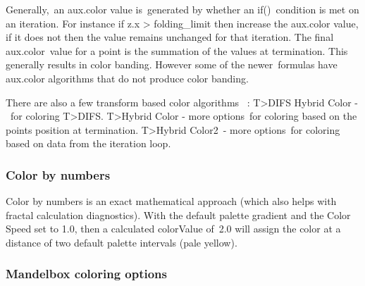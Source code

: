 Generally, an aux.color value is generated by whether an if() condition is met on an iteration. For instance if z.x > folding_limit then increase the aux.color value, if it does not then the value remains unchanged for that iteration. The final aux.color value for a point is the summation of the values at termination. This generally results in color banding. However some of the newer formulas have aux.color algorithms that do not produce color banding.

There are also a few transform based color algorithms  :
T>DIFS Hybrid Color - for coloring T>DIFS.
T>Hybrid Color - more options for coloring based on the points position at termination.
T>Hybrid Color2 - more options for coloring based on data from the iteration loop.


\subsubsection{Color by numbers}\label{materials-color by numbers}

Color by numbers is an exact mathematical approach (which also helps with fractal calculation diagnostics).
With the default palette gradient and the Color Speed set to 1.0, then a calculated colorValue of 2.0 will assign the color at a distance of two default palette intervals (pale yellow).

\subsubsection{Mandelbox coloring options}\label{materials-mandelbox}








